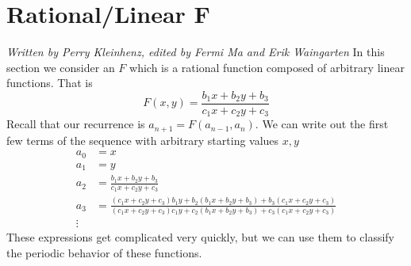 \documentclass[12pt]{article}
\begin{document}
\section{Rational/Linear F}
\label{rational and linear F}
\emph{Written by Perry Kleinhenz, edited by Fermi Ma and Erik Waingarten}
In this section we consider an $F$ which is a rational function composed of arbitrary linear functions. That is 
\begin{equation}
\label{rationallinear}
F(x,y) = \frac{ b_1 x + b_2 y + b_3}{ c_1 x+ c_2 y + c_3}
\end{equation}
Recall that our recurrence is $a_{n+1} = F( a_{n-1}, a_n)$. We can write out the first few terms of the sequence with arbitrary starting values $x,y$
\begin{align}
a_0 &= x \\ 
a_1 &=y \\
a_2 &= \frac{ b_1 x + b_2 y + b_3}{ c_1 x+ c_2 y + c_3}\\
\label{athree}a_3 &= \frac{(c_1 x+ c_2 y + c_3) b_1 y + b_2 (b_1 x + b_2 y + b_3)+ b_3(c_1 x+ c_2 y + c_3)}{ (c_1 x+ c_2 y + c_3)c_1 y+ c_2 (b_1 x + b_2 y + b_3) + c_3(c_1 x+ c_2 y + c_3)} \\
\vdots
\end{align}
These expressions get complicated very quickly, but we can use them to classify the periodic behavior of these functions.
\end{document}
